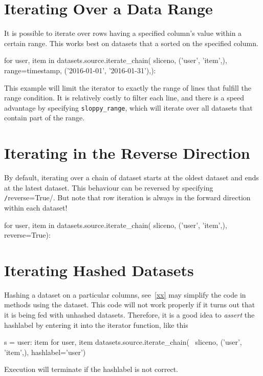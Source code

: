 \section{Iterating Over a Data Range}
It is possible to iterate over rows having a specified column's value
within a certain range.  This works best on datasets that a sorted on
the specified column.  
\begin{python}
for user, item in datasets.source.iterate_chain(
    sliceno, ('user', 'item',),
    range={timestamp, ('2016-01-01', '2016-01-31'),}):
\end{python}
This example will limit the iterator to exactly the range of lines
that fulfill the range condition.  It is relatively costly to filter
each line, and there is a speed advantage by specifying
\texttt{sloppy\_range}, which will iterate over all datasets that
contain part of the range.



\section{Iterating in the Reverse Direction}
By default, iterating over a chain of dataset starts at the oldest
dataset and ends at the latest dataset.  This behaviour can be
reversed by specifying \texttt/reverse=True/.  But note
that row iteration is always in the forward direction within each
dataset!
\begin{python}
for user, item in datasets.source.iterate_chain(
    sliceno, ('user', 'item',),
    reverse=True):
\end{python}



\section{Iterating Hashed Datasets}
Hashing a dataset on a particular columns, see~\ref{xx} may simplify
the code in methods using the dataset.  This code will not work
properly if it turns out that it is being fed with unhashed datasets.
Therefore, it is a good idea to \emph{assert} the hashlabel by
entering it into the iterator function, like this
\begin{python}
s = {user: item for user, item datasets.source.iterate_chain( \
     sliceno, ('user', 'item',), hashlabel='user')}
\end{python}
Execution will terminate if the hashlabel is not correct.



